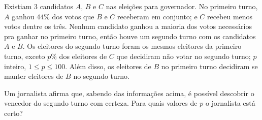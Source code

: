 Existiam 3 candidatos $A$, $B$ e $C$ nas eleições para governador.
No primeiro turno, $A$ ganhou $44\%$ dos votos que $B$ e $C$ receberam em conjunto; e $C$ recebeu menos votos dentre os três.
Nenhum candidato ganhou a maioria dos votos necessários pra ganhar no primeiro turno, então houve um segundo turno com os candidatos $A$ e $B$.
Os eleitores do segundo turno foram os mesmos eleitores da primeiro turno, exceto $p\%$ dos eleitores de $C$ que decidiram não votar no segundo turno; $p$ inteiro, $1 \le p \le 100$. Além disso, os eleitores de $B$ no primeiro turno decidiram se manter eleitores de $B$ no segundo turno. 

Um jornalista afirma que, sabendo das informações acima, é possível descobrir o vencedor do segundo turno com certeza. Para quais valores de $p$ o jornalista está certo?
